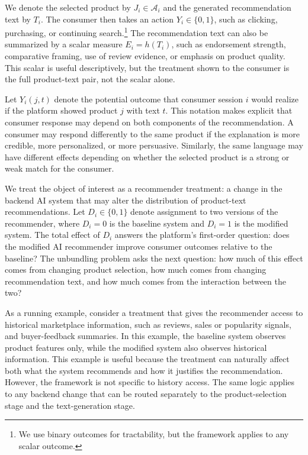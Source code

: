 \documentclass[11pt]{article}
\newcommand{\J}{J}
\newcommand{\Y}{Y}
\newcommand{\catalog}{\mathcal{A}}
\begin{document}
We denote the selected product by $\J_i \in \catalog_i$ and the generated recommendation text by $T_i$. The consumer then takes an action $\Y_i \in \{0,1\}$, such as clicking, purchasing, or continuing search.\footnote{We use binary outcomes for tractability, but the framework applies to any scalar outcome.} The recommendation text can also be summarized by a scalar measure $E_i = h(T_i)$, such as endorsement strength, comparative framing, use of review evidence, or emphasis on product quality. This scalar is useful descriptively, but the treatment shown to the consumer is the full product-text pair, not the scalar alone.

Let $\Y_i(j,t)$ denote the potential outcome that consumer session $i$ would realize if the platform showed product $j$ with text $t$. This notation makes explicit that consumer response may depend on both components of the recommendation. A consumer may respond differently to the same product if the explanation is more credible, more personalized, or more persuasive. Similarly, the same language may have different effects depending on whether the selected product is a strong or weak match for the consumer.

We treat the object of interest as a recommender treatment: a change in the backend AI system that may alter the distribution of product-text recommendations. Let $D_i \in \{0,1\}$ denote assignment to two versions of the recommender, where $D_i = 0$ is the baseline system and $D_i = 1$ is the modified system. The total effect of $D_i$ answers the platform's first-order question: does the modified AI recommender improve consumer outcomes relative to the baseline? The unbundling problem asks the next question: how much of this effect comes from changing product selection, how much comes from changing recommendation text, and how much comes from the interaction between the two?

As a running example, consider a treatment that gives the recommender access to historical marketplace information, such as reviews, sales or popularity signals, and buyer-feedback summaries. In this example, the baseline system observes product features only, while the modified system also observes historical information. This example is useful because the treatment can naturally affect both what the system recommends and how it justifies the recommendation. However, the framework is not specific to history access. The same logic applies to any backend change that can be routed separately to the product-selection stage and the text-generation stage.
\end{document}
